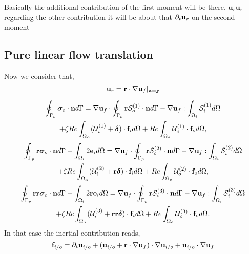 Basically the additional contribution of the first moment will be there, $\textbf{u}_r\textbf{u}_r$ regarding the other contribution it will be about that $\pddt \textbf{u}_r$ on the second moment 
\subsection{Pure linear flow translation}
Now we consider that, 
\begin{equation}
    \textbf{u}_r = \textbf{r}\cdot \grad \textbf{u}_f |_{\textbf{x}=\textbf{y}}
\end{equation}

\begin{multline}
    \intS[p]{\bm\sigma_{o}\cdot \textbf{n}}
    =
    \grad \textbf{u}_f\cdot \intS[p]{\textbf{r} \mathcal{S}_o^{(1)} \cdot \textbf{n}}
    - \grad\textbf{u}_f:\intO[i]{ \mathcal{S}_{i}^{(1)}}
    \\ 
    + \zeta Re \intO{(\mathcal{U}_{i}^{(1)} + \bm\delta)\cdot \textbf{f}_{i}} 
    + Re\intO[o]{\mathcal{U}_{o}^{(1)}\cdot \textbf{f}_{o}},
\end{multline}
\begin{multline}
    \intS[p]{\textbf{r}  \bm\sigma_{o}\cdot \textbf{n}}
    - \intO[i]{2\textbf{e}_i}
    =
    \grad \textbf{u}_f\cdot \intS[p]{\textbf{r}  \mathcal{S}_o^{(2)}\cdot \textbf{n}}
    - \grad\textbf{u}_f:\intO[i]{ \mathcal{S}_i^{(2)}}
    \\ 
    + \zeta Re \intO{(\mathcal{U}_{i}^{(2)}  + \textbf{r}\bm\delta)\cdot \textbf{f}_{i}} 
    + Re\intO[o]{\mathcal{U}_{o}^{(2)}\cdot \textbf{f}_{o}},
\end{multline}
\begin{multline}
    \intS[p]{\textbf{rr}  \bm\sigma_{o}\cdot \textbf{n}}
    - \intO[i]{2\textbf{re}_i }
    =
    \grad \textbf{u}_f\cdot \intS[p]{\textbf{r} \mathcal{S}_o^{(3)}\cdot \textbf{n}}
    - \grad\textbf{u}_f:\intO[i]{\mathcal{S}_i^{(3)}}\\
    + \zeta Re \intO{(\mathcal{U}_{i}^{(3)} + \textbf{rr}\bm\delta)\cdot \textbf{f}_{i}} 
    + Re\intO[o]{\mathcal{U}_{o}^{(3)} \cdot \textbf{f}_{o}}.
\end{multline}
In that case the inertial contribution reads, 
\begin{equation}
    \textbf{f}_{i/o} 
    =
    \pddt \textbf{u}_{i/o}
    + (\textbf{u}_{i/o} + \textbf{r}\cdot \grad \textbf{u}_f)\cdot \grad \textbf{u}_{i/o}
    + \textbf{u}_{i/o}\cdot \grad \textbf{u}_f
\end{equation}
